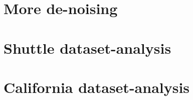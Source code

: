 \section{More de-noising}


\section{Shuttle dataset-analysis}

\section{California dataset-analysis}